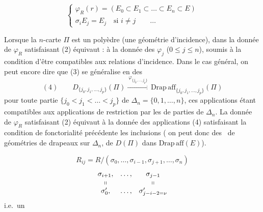 \documentclass[11pt,a4paper]{article}
\begin{document}

\[
\begin{cases}
\varphi_R(r) = (E_0\subset E_1\subset\dots\subset E_n\subset E)\\
\sigma_i E_j = E_j \quad\text{si } i\neq j \qquad \dots
\end{cases}
\]

Lorsque la $n$-carte $\Pi$ est un polyèdre (une géométrie d'incidence), dans la donnée de $\varphi_R$ satisfaisant (2) équivaut : à la donnée des $\varphi_j$ ($0\leq j\leq n$), soumis à la condition d'être compatibles aux relations d'incidence. Dans le cas  général, on peut encore dire que (3) se généralise en des
\[
(4)\qquad D_{\{j_0,j_1,\dots,j_p\}}(\Pi) \xrightarrow{\ \varphi_{\{j_0,\dots,j_p\}}\ } \mathrm{Drap\,aff}_{\{j_0,j_1,\dots,j_p\}}(\Pi)
\]
pour toute partie $\{j_0<j_1<\dots<j_p\}$ de $\Delta_n=\{0,1,\dots,n\}$, ces applications étant compatibles aux applications de restriction  par les  de parties de $\Delta_n$. La donnée de $\varphi_R$ satisfaisant (2) équivaut à la donnée des applications (4) satisfaisant la condition de fonctorialité précédente \ill{} les inclusions  ( \ill{} on peut donc  \ill{} des \ de géométries de drapeaux   sur $\Delta_n$, de $D(\Pi)$ dans $\mathrm{Drap\,aff}(E)$).

\[
R_{ij} = R/(\sigma_0,\dots,\sigma_{i-1},\sigma_{j+1},\dots,\sigma_n)
\]
\[
\begin{matrix}
\sigma_{i+1}, & \dots, & \sigma_{j-1}\\
\shortparallel & & \shortparallel\\
\sigma'_0, & \dots, & \sigma'_{j-i-2=\nu}
\end{matrix}
\]
 i.e.\ un
\end{document}
